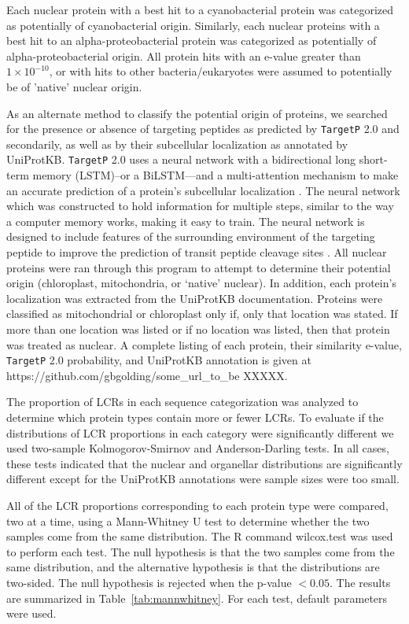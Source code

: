 \documentclass[a4paper,12pt]{article}
\newcommand{\tget}{\mbox{\texttt{TargetP}}\xspace}
\newcommand{\missing}{{\color{red}XXXXX}\xspace}
\begin{document}
\begin{multicols}{2}
Each nuclear protein with a best hit to a cyanobacterial protein was
categorized as potentially of cyanobacterial origin. Similarly, each
nuclear proteins with a best hit to an alpha-proteobacterial protein was
categorized as potentially of alpha-proteobacterial origin. All protein
hits with an e-value greater than $1 \times 10^{-10}$, or with hits to
other bacteria/eukaryotes were assumed to potentially be of 'native'
nuclear origin.

As an alternate method to classify the potential origin of proteins,
we searched for the presence or absence of targeting peptides as
predicted by \tget 2.0 and secondarily, as well as by their subcellular
localization as annotated by UniProtKB. \tget 2.0 uses a neural network
with a bidirectional long short-term memory (LSTM)--or a BiLSTM---and a
multi-attention mechanism to make an accurate prediction of a protein's
subcellular localization \citep{ArmenterosEtAl2019}. The neural network
which was constructed to hold information for multiple steps, similar
to the way a computer memory works, making it easy to train. The
neural network is designed to include features of the surrounding
environment of the targeting peptide to improve the prediction of
transit peptide cleavage sites \citep{ArmenterosEtAl2019}. All nuclear
proteins were ran through this program to attempt to determine their
potential origin (chloroplast, mitochondria, or `native' nuclear). In
addition, each protein's localization was extracted from the UniProtKB
documentation. Proteins were classified as mitochondrial or chloroplast
only if, only that location was stated. If more than one location was
listed or if no location was listed, then that protein was treated
as nuclear. A complete listing of each protein, their similarity
e-value, \tget 2.0 probability, and UniProtKB annotation is given at
https://github.com/gbgolding/some\_url\_to\_be \missing.

The proportion of LCRs in each sequence categorization was analyzed to
determine which protein types contain more or fewer LCRs. To evaluate if
the distributions of LCR proportions in each category were significantly
different we used two-sample Kolmogorov-Smirnov and Anderson-Darling
tests.  In all cases, these tests indicated that the nuclear and
organellar distributions are significantly different except for the
UniProtKB annotations were sample sizes were too small.

All of the LCR proportions corresponding to each protein type were
compared, two at a time, using a Mann-Whitney U test to
determine whether the two samples come from the same distribution. The R
command wilcox.test was used to perform each test. The null hypothesis is
that the two samples come from the same distribution, and the alternative
hypothesis is that the distributions are two-sided. The null hypothesis
is rejected when the p-value $<0.05$. The results are summarized
in Table~\ref{tab:mannwhitney}. For each test, default parameters
were used.



\end{multicols}
\end{document}
